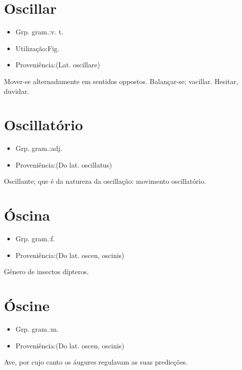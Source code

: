 \section{Oscillar}
\begin{itemize}
\item {Grp. gram.:v. t.}
\end{itemize}
\begin{itemize}
\item {Utilização:Fig.}
\end{itemize}
\begin{itemize}
\item {Proveniência:(Lat. \textunderscore oscillare\textunderscore )}
\end{itemize}
Mover-se alternadamente em sentidos oppostos.
Balançar-se; vacillar.
Hesitar, duvidar.
\section{Oscillatório}
\begin{itemize}
\item {Grp. gram.:adj.}
\end{itemize}
\begin{itemize}
\item {Proveniência:(Do lat. \textunderscore oscillatus\textunderscore )}
\end{itemize}
Oscillante; que é da natureza da oscillação: \textunderscore movimento oscillatório\textunderscore .
\section{Óscina}
\begin{itemize}
\item {Grp. gram.:f.}
\end{itemize}
\begin{itemize}
\item {Proveniência:(Do lat. \textunderscore oscen\textunderscore , \textunderscore oscinis\textunderscore )}
\end{itemize}
Gênero de insectos dípteros.
\section{Óscine}
\begin{itemize}
\item {Grp. gram.:m.}
\end{itemize}
\begin{itemize}
\item {Proveniência:(Do lat. \textunderscore oscen\textunderscore , \textunderscore oscinis\textunderscore )}
\end{itemize}
Ave, por cujo canto os áugures regulavam as suas predicções.
